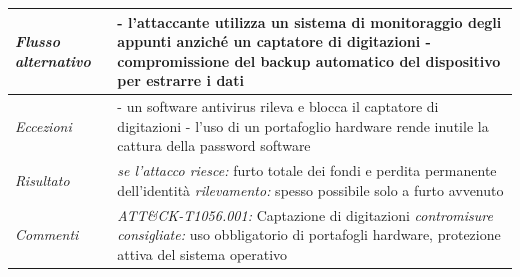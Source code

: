 \begin{longtable}{| >{\columncolor{abuseCol}}p{} | p{} |}
\hline
\textit{Flusso alternativo} & - l'attaccante utilizza un sistema di monitoraggio degli appunti anziché un captatore di digitazioni \newline - compromissione del backup automatico del dispositivo per estrarre i dati \\
\hline
\textit{Eccezioni} & - un software antivirus rileva e blocca il captatore di digitazioni \newline - l'uso di un portafoglio hardware rende inutile la cattura della password software \\
\hline
\textit{Risultato} & \textit{se l'attacco riesce:} furto totale dei fondi e perdita permanente dell'identità \newline \textit{rilevamento:} spesso possibile solo a furto avvenuto \\
\hline
\textit{Commenti} & \textit{ATT\&CK-T1056.001:} Captazione di digitazioni \newline \textit{contromisure consigliate:} uso obbligatorio di portafogli hardware, protezione attiva del sistema operativo \\
\hline
\end{longtable}

